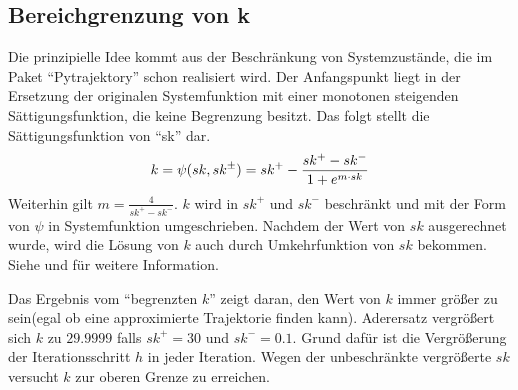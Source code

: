 \subsection{Bereichgrenzung von k}
\label{Begrenzen_den_Bereich_von_k}
Die prinzipielle Idee kommt aus der Beschränkung von Systemzustände, die im Paket ``Pytrajektory'' schon realisiert wird. Der Anfangspunkt liegt in der Ersetzung der originalen Systemfunktion mit einer monotonen steigenden Sättigungsfunktion, die keine Begrenzung besitzt. Das folgt stellt die Sättigungsfunktion von ``sk'' dar.
\begin{eqnarray}
k = \psi (sk,sk^{\pm}) \notag = sk^{+}- \frac{sk^{+}-sk^{-}}{1+e^{m\cdot sk}}\label{eq:Saturation_function}
\end{eqnarray}
Weiterhin gilt $m = \frac{4}{sk^{+}-sk^{-}}$. $k$ wird in $sk^{+}$ und $sk^{-}$ beschränkt und mit der Form von $\psi$ in Systemfunktion umgeschrieben. Nachdem der Wert von $sk$ ausgerechnet wurde, wird die Lösung von $k$ auch durch Umkehrfunktion von $sk$ bekommen. Siehe \cite{graichen2006inversionsbasierter} und \cite{kunze2016pytrajectory} für weitere Information.

Das Ergebnis vom ``begrenzten $k$'' zeigt daran, den Wert von $k$ immer größer zu sein(egal ob eine approximierte Trajektorie finden kann). Aderersatz vergrößert sich $k$ zu $29.9999$ falls $sk^{+}=30$ und $sk^{-}=0.1$. Grund dafür ist die Vergrößerung der Iterationsschritt $h$ in jeder  Iteration. Wegen der unbeschränkte vergrößerte $sk$ versucht $k$ zur oberen Grenze zu erreichen.  

